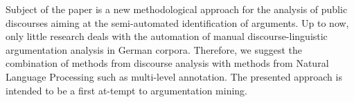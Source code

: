 Subject of the paper is a new methodological approach for the analysis of public discourses aiming at the semi-automated identification of arguments. Up to now, only little research deals with the automation of manual discourse-linguistic argumentation analysis in German corpora. Therefore, we suggest the combination of methods from discourse analysis with methods from Natural Language Processing such as multi-level annotation. The presented approach is intended to be a first at-tempt to argumentation mining.
